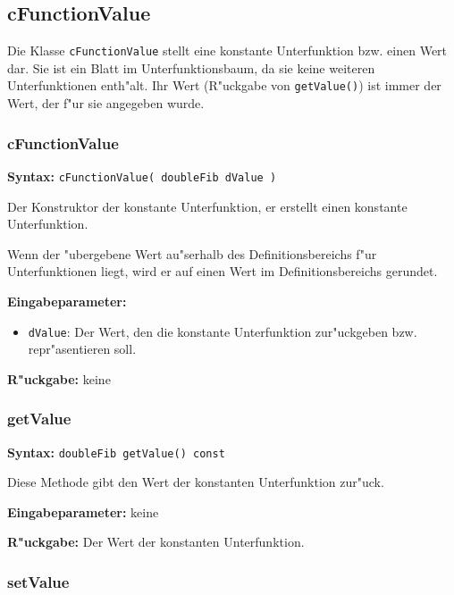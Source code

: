 \subsection{cFunctionValue}

Die Klasse \verb|cFunctionValue| stellt eine konstante Unterfunktion bzw. einen Wert dar. Sie ist ein Blatt im Unterfunktionsbaum, da sie keine weiteren Unterfunktionen enth"alt. Ihr Wert (R"uckgabe von \verb|getValue()|) ist immer der Wert, der f"ur sie angegeben wurde.


\subsubsection{cFunctionValue}

\textbf{Syntax:} \verb|cFunctionValue( doubleFib dValue )|

\bigskip\noindent
Der Konstruktor der konstante Unterfunktion, er erstellt einen konstante Unterfunktion.

Wenn der "ubergebene Wert au"serhalb des Definitionsbereichs f"ur Unterfunktionen liegt, wird er auf einen Wert im Definitionsbereichs gerundet.

\bigskip\noindent
\textbf{Eingabeparameter:}
\begin{itemize}
 \item \verb|dValue|: Der Wert, den die konstante Unterfunktion zur"uckgeben bzw. repr"asentieren soll.
\end{itemize}

\bigskip\noindent
\textbf{R"uckgabe:} keine


\subsubsection{getValue}

\textbf{Syntax:} \verb|doubleFib getValue() const|

\bigskip\noindent
Diese Methode gibt den Wert der konstanten Unterfunktion zur"uck.

\bigskip\noindent
\textbf{Eingabeparameter:} keine

\bigskip\noindent
\textbf{R"uckgabe:} Der Wert der konstanten Unterfunktion.


\subsubsection{setValue}

